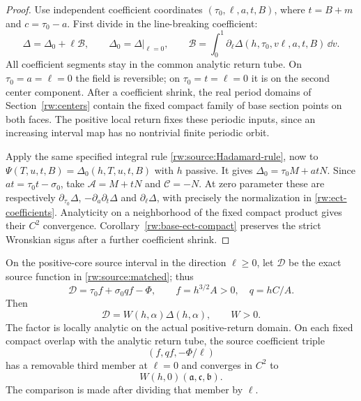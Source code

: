 \begin{proof}
Use independent coefficient coordinates
$(\tau_0,\ell,a,t,B)$, where $t=B+m$ and $c=\tau_0-a$.
First divide in the line-breaking coefficient:
\[
 \Delta=\Delta_0+\ell\mathcal B,\qquad
 \Delta_0=\Delta|_{\ell=0},\qquad
 \mathcal B=\int_0^1\partial_\ell\Delta
                 (h,\tau_0,v\ell,a,t,B)\,\dd v.
\]
All coefficient segments stay in the common analytic return tube.
On $\tau_0=a=\ell=0$ the field is reversible; on
$\tau_0=t=\ell=0$ it is on the second center component.
After a coefficient shrink, the real period domains of
Section~\ref{rw:centers} contain the fixed compact family of base
section points on both faces. The positive local return fixes these
periodic inputs, since an increasing interval map has no nontrivial
finite periodic orbit.

Apply the same specified integral rule
\eqref{rw:source:Hadamard-rule}, now to
$\Psi(T,u,t,B)=\Delta_0(h,T,u,t,B)$ with $h$ passive.
It gives $\Delta_0=\tau_0M+atN$. Since
$at=\tau_0t-\sigma_0$, take
$\mathcal A=M+tN$ and $\mathcal C=-N$.
At zero parameter these are respectively
$\partial_{\tau_0}\Delta$, $-\partial_a\partial_t\Delta$
and $\partial_\ell\Delta$, with precisely the normalization
in \eqref{rw:ect-coefficients}. Analyticity on a neighborhood of the
fixed compact product gives their $C^2$ convergence.
Corollary~\ref{rw:base-ect-compact} preserves the strict Wronskian
signs after a further coefficient shrink.
\end{proof}

\begin{lemma}
\label{rw:source:common-displacement}
On the positive-core source interval in the direction $\ell\ge0$,
let $\mathcal D$ be the exact source function in
\eqref{rw:source:matched}; thus
\begin{equation}\label{rw:source:D-columns}
 \mathcal D=\tau_0 f+\sigma_0 qf-\Phi,
 \qquad f=h^{3/2}A>0,\quad q=hC/A.
\end{equation}
Then
\begin{equation}\label{rw:source:positive-unit}
 \mathcal D=W(h,\alpha)\Delta(h,\alpha),\qquad W>0.
\end{equation}
The factor is locally analytic on the actual positive-return domain.
On each fixed compact overlap with the analytic return tube, the
source coefficient triple
\[
 (f,qf,-\Phi/\ell)
\]
has a removable third member at $\ell=0$ and converges in $C^2$ to
\begin{equation}\label{rw:source:common-base-triple}
 W(h,0)(\mathfrak a,\mathfrak c,\mathfrak b).
\end{equation}
The comparison is made after dividing that member by $\ell$.
\end{lemma}

